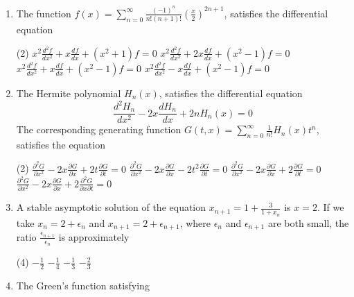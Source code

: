 \begin{enumerate}[label=\color{ocre}\textbf{\arabic*.}]
	{}
	\begin{tasks}(4)
		\task[\textbf{A.}] $0.26$
		\task[\textbf{C.}] $0.5$
		\task[\textbf{D.}] $-1$
	\end{tasks}
	\item The function $f(x)=\sum_{n=0}^{\infty} \frac{(-1)^{n}}{n !(n+1) !}\left(\frac{x}{2}\right)^{2 n+1}$, satisfies the differential equation
	{}
	\begin{tasks}(2)
		\task[\textbf{A.}]  $x^{2} \frac{d^{2} f}{d x^{2}}+x \frac{d f}{d x}+\left(x^{2}+1\right) f=0$
		\task[\textbf{B.}]  $x^{2} \frac{d^{2} f}{d x^{2}}+2 x \frac{d f}{d x}+\left(x^{2}-1\right) f=0$
		\task[\textbf{C.}] $x^{2} \frac{d^{2} f}{d x^{2}}+x \frac{d f}{d x}+\left(x^{2}-1\right) f=0$
		\task[\textbf{D.}] $x^{2} \frac{d^{2} f}{d x^{2}}-x \frac{d f}{d x}+\left(x^{2}-1\right) f=0$
	\end{tasks}
	\item
	 The Hermite polynomial $H_{n}(x)$, satisfies the differential equation
	$$
	\frac{d^{2} H_{n}}{d x^{2}}-2 x \frac{d H_{n}}{d x}+2 n H_{n}(x)=0
	$$
	The corresponding generating function $G(t, x)=\sum_{n=0}^{\infty} \frac{1}{n !} H_{n}(x) t^{n}$, satisfies the equation
	{}
	\begin{tasks}(2)
		\task[\textbf{A.}] $\frac{\partial^{2} G}{\partial x^{2}}-2 x \frac{\partial G}{\partial x}+2 t \frac{\partial G}{\partial t}=0$
		\task[\textbf{B.}] $\frac{\partial^{2} G}{\partial x^{2}}-2 x \frac{\partial G}{\partial x}-2 t^{2} \frac{\partial G}{\partial t}=0$
		\task[\textbf{C.}] $\frac{\partial^{2} G}{\partial x^{2}}-2 x \frac{\partial G}{\partial x}+2 \frac{\partial G}{\partial t}=0$
		\task[\textbf{D.}]  $\frac{\partial^{2} G}{\partial x^{2}}-2 x \frac{\partial G}{\partial x}+2 \frac{\partial^{2} G}{\partial x \partial t}=0$
	\end{tasks}
	\item A stable asymptotic solution of the equation $x_{n+1}=1+\frac{3}{1+x_{n}}$ is $x=2$. If we take $x_{n}=2+\epsilon_{n}$ and $x_{n+1}=2+\epsilon_{n+1}$, where $\epsilon_{n}$ and $\epsilon_{n+1}$ are both small, the ratio $\frac{\epsilon_{n+1}}{\epsilon_{n}}$ is approximately
	{}
	\begin{tasks}(4)
		\task[\textbf{A.}] $-\frac{1}{2}$
		\task[\textbf{B.}] $-\frac{1}{4}$
		\task[\textbf{C.}]  $-\frac{1}{3}$
		\task[\textbf{D.}] $-\frac{2}{3}$
	\end{tasks}
	\item  The Green's function satisfying

\end{enumerate}
